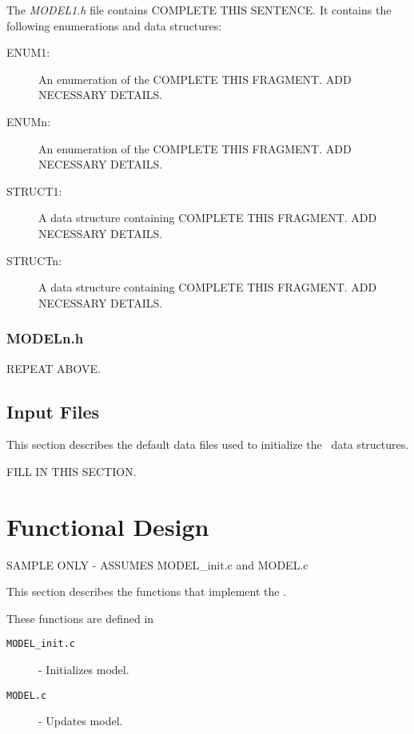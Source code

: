 \documentclass[twoside,11pt,titlepage]{report}
\begin{document}
The {\em MODEL1.h} file contains COMPLETE THIS SENTENCE.
It contains the following enumerations and data structures:
\begin{description}

\item [ENUM1:] An enumeration of the COMPLETE THIS FRAGMENT.
ADD NECESSARY DETAILS.

\item [ENUMn:] An enumeration of the COMPLETE THIS FRAGMENT.
ADD NECESSARY DETAILS.

\item [STRUCT1:] A data structure containing COMPLETE THIS FRAGMENT.
ADD NECESSARY DETAILS.

\item [STRUCTn:] A data structure containing COMPLETE THIS FRAGMENT.
ADD NECESSARY DETAILS.

\end{description}

% 

\subsection{MODELn.h}

REPEAT ABOVE.


\section{Input Files}

This section describes the default data files used to
initialize the \MODEL\ data structures.

FILL IN THIS SECTION.


\chapter{Functional Design}\label{sec:functional_design}

SAMPLE ONLY - ASSUMES MODEL\_init.c and MODEL.c

This section describes the functions that implement the \MODEL.

These functions are defined in
\begin{description}
\item[\texorpdfstring{\tt MODEL\_init.c}{MODEL\_init.c}] - Initializes model.
\item[\texorpdfstring{\tt MODEL.c}{MODEL.c}] - Updates model.
\end{description}
\end{document}
